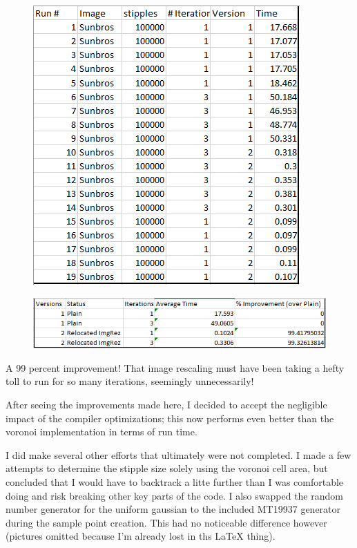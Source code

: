 \documentclass[11pt]{article}
\begin{document}
\begin{figure}[H]
\includegraphics[scale=0.8]{hedcut-table.png}
\end{figure}
\begin{figure}[H]
\includegraphics[scale=0.8]{hedcut-results.png}
\end{figure}

A 99 percent improvement! That image rescaling must have been taking a hefty toll to run for so many iterations, seemingly unnecessarily!

After seeing the improvements made here, I decided to accept the negligible impact of the compiler optimizations; this now performs even better than the voronoi implementation in terms of run time.

I did make several other efforts that ultimately were not completed. I made a few attempts to determine the stipple size solely using the voronoi cell area, but concluded that I would have to backtrack a litte further than I was comfortable doing and risk breaking other key parts of the code. I also swapped the random number generator for the uniform gaussian to the included MT19937 generator during the sample point creation. This had no noticeable difference however (pictures omitted because I'm already lost in ths LaTeX thing).



\end{document}
